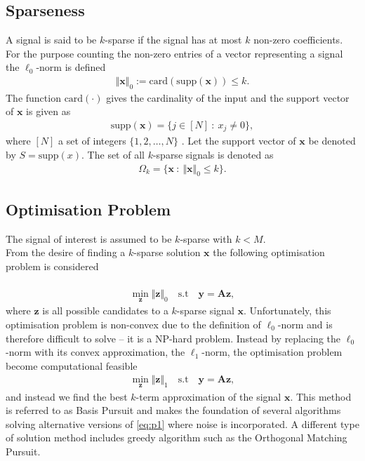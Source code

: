 \subsection{Sparseness} 
A signal is said to be $k$-sparse if the signal has at most $k$ non-zero coefficients. For the purpose counting the non-zero entries of a vector representing a signal the $\ell_0$-norm is defined
\begin{align*}
\Vert \mathbf{x} \Vert_0 := \text{card}(\text{supp}(\mathbf{x})) \leq k.
\end{align*}
The function $\text{card}(\cdot)$ gives the cardinality of the input and the support vector of $\mathbf{x}$ is given as
\begin{align*}
\text{supp}(\mathbf{x}) = \{ j \in [N] \ : \ x_j \neq 0 \},
\end{align*} 
where $[N]$ a set of integers $\{1,2,\hdots,N\}$ \cite[p. 41]{FR}. Let the support vector of $\textbf{x}$ be denoted by $S =\text{supp}(x)$. The set of all $k$-sparse signals is denoted as
\begin{align*}
\Omega_k = \{ \mathbf{x} \ : \ \Vert \mathbf{x} \Vert_0 \leq k \}.
\end{align*}

\subsection{Optimisation Problem} 
The signal of interest is assumed to be $k$-sparse with $k<M$. \\
From the desire of finding a $k$-sparse solution $\mathbf{x}$ the following optimisation problem is considered
\\ \\
\begin{align*}
\min_{\mathbf{z}} \Vert \mathbf{z} \Vert_0 \quad \text{s.t} \quad \mathbf{y} = \mathbf{Az},
\end{align*}
where $\mathbf{z}$ is all possible candidates to a $k$-sparse signal $\mathbf{x}$.
Unfortunately, this optimisation problem is non-convex due to the definition of $\ell_0$-norm and is therefore difficult to solve -- it is a NP-hard problem. Instead by replacing the $\ell_0$-norm with its convex approximation, the $\ell_1$-norm, the optimisation problem become computational feasible \cite[p. 27]{CS}
\begin{align}\label{eq:p1}
\min_{\mathbf{z}} \Vert \mathbf{z} \Vert_1 \quad \text{s.t} \quad \mathbf{y} = \mathbf{Az},
\end{align} 
and instead we find the best $k$-term approximation of the signal $\mathbf{x}$.
This method is referred to as Basis Pursuit and makes the foundation of several algorithms solving alternative versions of \eqref{eq:p1} where noise is incorporated. A different type of solution method includes greedy algorithm such as the Orthogonal Matching Pursuit.    
      
